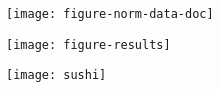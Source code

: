\documentclass{article}
\begin{document}
\texttt{[image: figure-norm-data-doc]}


\texttt{[image: figure-results]}

\texttt{[image: sushi]}
\end{document}
